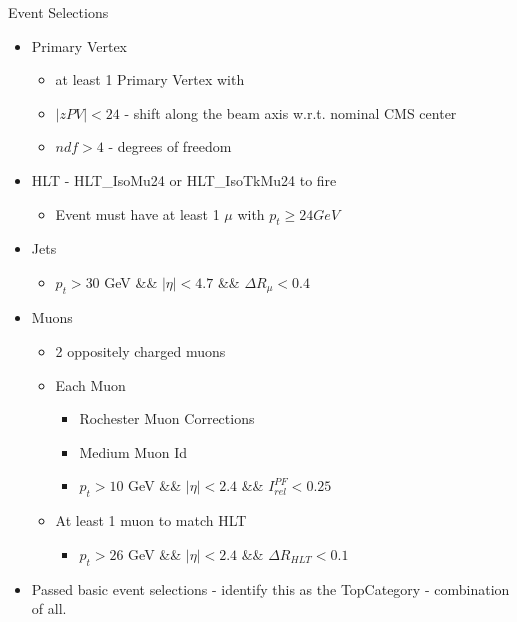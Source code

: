\documentclass[pdf, 9pt]{beamer}
\begin{document}
  \begin{frame}{Event Selections}
    \begin{itemize}
      \item Primary Vertex
        \begin{itemize}
          \item at least 1 Primary Vertex with
          \item $|zPV| < 24$ - shift along the beam axis w.r.t. nominal CMS center
          \item $ndf > 4$ - degrees of freedom
        \end{itemize}
      \item HLT - HLT\_IsoMu24 or HLT\_IsoTkMu24 to fire
        \begin{itemize}
          \item \alert{Event must have at least 1 $\mu$ with $p_{t} \ge 24GeV$}
        \end{itemize}
      \item Jets
        \begin{itemize}
          \item $p_{t}>30$ GeV \&\& $|\eta|<4.7$ \&\& $\Delta R_{\mu} < 0.4$
        \end{itemize}
      \item Muons
        \begin{itemize}
          \item 2 oppositely charged muons
          \item Each Muon
            \begin{itemize}
              \item Rochester Muon Corrections
              \item Medium Muon Id
              \item $p_{t} > 10$ GeV \&\& $|\eta| < 2.4$ \&\& $I_{rel}^{PF} < 0.25$
            \end{itemize}
          \item At least 1 muon to match HLT
            \begin{itemize}
              \item $p_{t}>26$ GeV \&\& $|\eta|<2.4$ \&\& $\Delta R_{HLT} < 0.1$
            \end{itemize}
        \end{itemize}
      \item Passed basic event selections - identify this as the \alert{TopCategory} - combination of all.
    \end{itemize}
  \end{frame}
\end{document}
